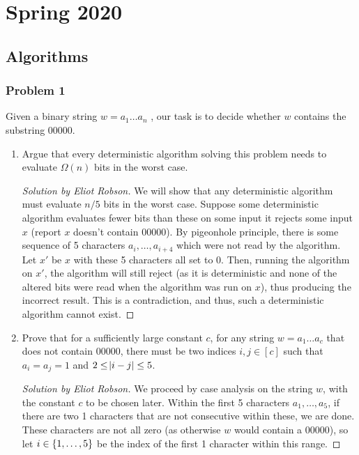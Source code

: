 \documentclass{article}
\newenvironment{solution}[1]{\begin{proof}[Solution by #1]}{\end{proof}}
\begin{document}
\section{Spring 2020}

\subsection{Algorithms}

\subsubsection{Problem 1}
Given a binary string \(w = a_1 \dots a_n\) , our task is to decide whether \(w\) contains the substring 00000.


\begin{enumerate}
    \item Argue that every deterministic algorithm solving this problem needs to evaluate \(\Omega(n)\) bits in the worst case.
    
    \begin{solution}{Eliot Robson}
        We will show that any deterministic algorithm must evaluate \(n/5\) bits in the worst case. Suppose some deterministic algorithm evaluates fewer bits than these on some input it rejects some input \(x\) (report \(x\) doesn't contain 00000). By pigeonhole principle, there is some sequence of 5 characters \(a_i, \dots, a_{i+4}\) which were not read by the algorithm. Let \(x'\) be \(x\) with these 5 characters all set to 0. Then, running the algorithm on \(x'\), the algorithm will still reject (as it is deterministic and none of the altered bits were read when the algorithm was run on \(x\)), thus producing the incorrect result. This is a contradiction, and thus, such a deterministic algorithm cannot exist.
    \end{solution}
    
    \item Prove that for a sufficiently large constant \(c\), for any string \(w = a_1 \dots a_c\) that does not contain 00000, there must be two indices \(i,j \in [c]\) such that \(a_i = a_j = 1\) and \(2 \leq \abs{i - j} \leq 5\).
    
    \begin{solution}{Eliot Robson}
        We proceed by case analysis on the string \(w\), with the constant \(c\) to be chosen later. Within the first 5 characters \(a_1, \dots, a_5\), if there are two 1 characters that are not consecutive within these, we are done. These characters are not all zero (as otherwise \(w\) would contain a 00000), so let \(i \in \set{1, \dots, 5}\) be the index of the first 1 character within this range.
        

\end{solution}
\end{enumerate}
\end{document}
